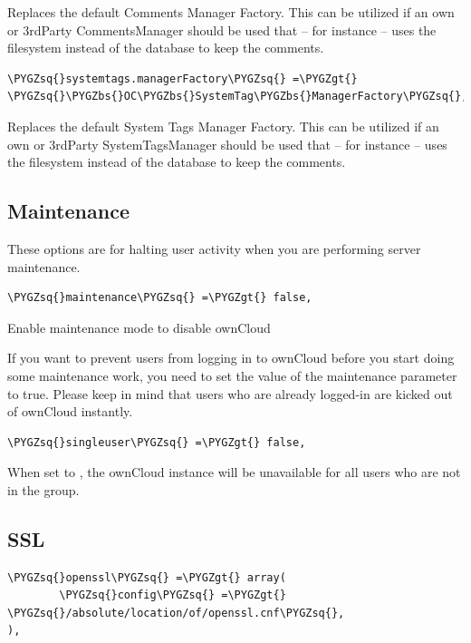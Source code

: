 \documentclass[letterpaper,10pt,english]{sphinxmanual}
\def\PYGZbs{\char`\\}
\def\PYGZgt{\char`\>}
\def\PYGZsq{\char`\'}
\renewcommand\PYGZsq{\textquotesingle}
\begin{document}
Replaces the default Comments Manager Factory. This can be utilized if an
own or 3rdParty CommentsManager should be used that – for instance – uses the
filesystem instead of the database to keep the comments.

\begin{Verbatim}[commandchars=\\\{\}]
\PYGZsq{}systemtags.managerFactory\PYGZsq{} =\PYGZgt{} \PYGZsq{}\PYGZbs{}OC\PYGZbs{}SystemTag\PYGZbs{}ManagerFactory\PYGZsq{},
\end{Verbatim}

Replaces the default System Tags Manager Factory. This can be utilized if an
own or 3rdParty SystemTagsManager should be used that – for instance – uses the
filesystem instead of the database to keep the comments.


\subsection{Maintenance}
\label{configuration_server/config_sample_php_parameters:maintenance}
These options are for halting user activity when you are performing server
maintenance.

\begin{Verbatim}[commandchars=\\\{\}]
\PYGZsq{}maintenance\PYGZsq{} =\PYGZgt{} false,
\end{Verbatim}

Enable maintenance mode to disable ownCloud

If you want to prevent users from logging in to ownCloud before you start
doing some maintenance work, you need to set the value of the maintenance
parameter to true. Please keep in mind that users who are already logged-in
are kicked out of ownCloud instantly.

\begin{Verbatim}[commandchars=\\\{\}]
\PYGZsq{}singleuser\PYGZsq{} =\PYGZgt{} false,
\end{Verbatim}

When set to , the ownCloud instance will be unavailable for all users
who are not in the  group.


\subsection{SSL}
\label{configuration_server/config_sample_php_parameters:ssl}
\begin{Verbatim}[commandchars=\\\{\}]
\PYGZsq{}openssl\PYGZsq{} =\PYGZgt{} array(
        \PYGZsq{}config\PYGZsq{} =\PYGZgt{} \PYGZsq{}/absolute/location/of/openssl.cnf\PYGZsq{},
),
\end{Verbatim}
\end{document}
